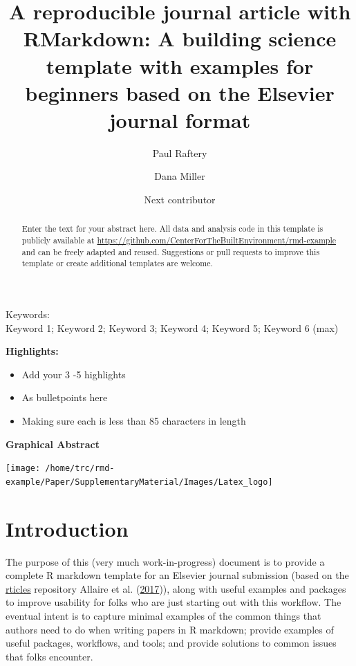 \documentclass[]{elsarticle} %
\providecommand{\tightlist}{%
  \setlength{\itemsep}{0pt}\setlength{\parskip}{0pt}}
\begin{document}
\begin{frontmatter}

  \title{A reproducible journal article with RMarkdown: A building science template with examples for beginners based on the Elsevier journal format}
    \author[CBE]{Paul Raftery}
    \author[CBE]{Dana Miller}
  
    \author[Organization2]{Next contributor}
  
      \address[CBE]{Center for the Built Environment, UC Berkeley, 390 Wurster Hall, Berkeley, CA, 94720, USA}
    \address[Organisation2]{Another organization, and their address}
    
  \begin{abstract}
  Enter the text for your abstract here. All data and analysis code in this template is publicly available at \url{https://github.com/CenterForTheBuiltEnvironment/rmd-example} and can be freely adapted and reused. Suggestions or pull requests to improve this template or create additional templates are welcome.
  \end{abstract}
  
 \end{frontmatter}

Keywords:\\
Keyword 1; Keyword 2; Keyword 3; Keyword 4; Keyword 5; Keyword 6 (max)

\pagebreak

\textbf{Highlights:}

\begin{itemize}
\tightlist
\item
  Add your 3 -5 highlights
\item
  As bulletpoints here
\item
  Making sure each is less than 85 characters in length
\end{itemize}

\textbf{Graphical Abstract}

\texttt{[image: /home/trc/rmd-example/Paper/SupplementaryMaterial/Images/Latex\_logo]}

\pagebreak

\hypertarget{introduction}{%
\section{Introduction}\label{introduction}}

The purpose of this (very much work-in-progress) document is to provide a complete R markdown template for an Elsevier journal submission (based on the \href{https://github.com/rstudio/rticles}{rticles} repository Allaire et al. (\protect\hyperlink{ref-rticles}{2017})), along with useful examples and packages to improve usability for folks who are just starting out with this workflow. The eventual intent is to capture minimal examples of the common things that authors need to do when writing papers in R markdown; provide examples of useful packages, workflows, and tools; and provide solutions to common issues that folks encounter.
\end{document}
